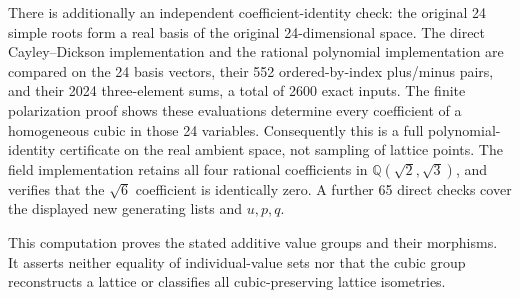 There is additionally an independent coefficient-identity check:
the original 24 simple roots form a real basis of the original
24-dimensional space. The direct Cayley--Dickson implementation
and the rational polynomial implementation are compared on the
24 basis vectors, their 552 ordered-by-index plus/minus pairs,
and their 2024 three-element sums, a total of 2600 exact inputs.
The finite polarization proof shows these evaluations determine
every coefficient of a homogeneous cubic in those 24 variables.
Consequently this is a full polynomial-identity certificate on
the real ambient space, not sampling of lattice points. The
field implementation retains all four rational coefficients in
\(\mathbb Q(\sqrt2,\sqrt3)\), and verifies that the \(\sqrt6\)
coefficient is identically zero. A further 65 direct checks cover
the displayed new generating lists and \(u,p,q\).

This computation proves the stated additive value groups and
their morphisms. It asserts neither equality of individual-value
sets nor that the cubic group reconstructs a lattice or classifies
all cubic-preserving lattice isometries.

